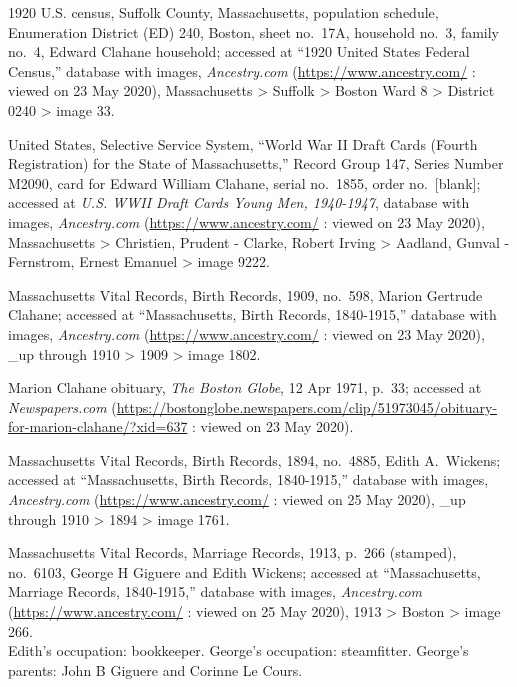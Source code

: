 \begin{thebibliography}{999}
	1920 U.S. census, Suffolk County, Massachusetts, population schedule, Enumeration District (ED) 240, Boston, sheet no.\ 17A, household no.\ 3, family no.\ 4, Edward Clahane household; accessed at ``1920 United States Federal Census,'' database with images, \textit{Ancestry.com} (\url{https://www.ancestry.com/} : viewed on 23 May 2020), Massachusetts > Suffolk > Boston Ward 8 > District 0240 > image 33.
	
	United States, Selective Service System, ``World War II Draft Cards (Fourth Registration) for the State of Massachusetts,'' Record Group 147, Series Number M2090, card for Edward William Clahane, serial no.\ 1855, order no.\ [blank]; accessed at \textit{U.S. WWII Draft Cards Young Men, 1940-1947}, database with images, \textit{Ancestry.com} (\url{https://www.ancestry.com/} : viewed on 23 May 2020), Massachusetts > Christien, Prudent - Clarke, Robert Irving > Aadland, Gunval - Fernstrom, Ernest Emanuel > image 9222.
	
	Massachusetts Vital Records, Birth Records, 1909, no.\ 598, Marion Gertrude Clahane; accessed at ``Massachusetts, Birth Records, 1840-1915,'' database with images, \textit{Ancestry.com} (\url{https://www.ancestry.com/} : viewed on 23 May 2020), \_up through 1910 > 1909 > image 1802.
	
	Marion Clahane obituary, \textit{The Boston Globe}, 12 Apr 1971, p.\ 33; accessed at \textit{Newspapers.com} (\url{https://bostonglobe.newspapers.com/clip/51973045/obituary-for-marion-clahane/?xid=637} : viewed on 23 May 2020).
	
	Massachusetts Vital Records, Birth Records, 1894, no.\ 4885, Edith A.\ Wickens; accessed at ``Massachusetts, Birth Records, 1840-1915,'' database with images, \textit{Ancestry.com} (\url{https://www.ancestry.com/} : viewed on 25 May 2020), \_up through 1910 > 1894 > image 1761.
	
	Massachusetts Vital Records, Marriage Records, 1913, p.\ 266 (stamped), no.\ 6103, George H Giguere and Edith Wickens; accessed at ``Massachusetts, Marriage Records, 1840-1915,'' database with images, \textit{Ancestry.com} (\url{https://www.ancestry.com/} : viewed on 25 May 2020), 1913 > Boston > image 266.\\
	Edith's occupation: bookkeeper. George's occupation: steamfitter. George's parents: John B Giguere and Corinne Le Cours.
	

\end{thebibliography}
